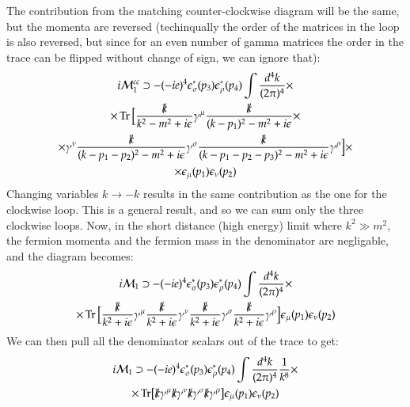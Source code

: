 \documentclass{article}
\begin{document}
The contribution from the matching counter-clockwise diagram will be the same, but the momenta are reversed (techinqually the order of the matrices in the loop is also reversed, but since for an even number of gamma matrices the order in the trace can be flipped without change of sign, we can ignore that):
\begin{equation}
\begin{gathered}
    i \mathcal{M}_1^{cc} \supset
    -(-ie)^4\epsilon^*_\sigma(p_3)\epsilon^*_\rho(p_4)
    \int \frac{d^4k}{(2\pi)^4}
    \times \\ \times
    \Tr\Big[\frac{\slashed{k}}{k^2 - m^2 + i\epsilon}\gamma^\mu \frac{\slashed{k}}{(k - p_1)^2 - m^2 + i\epsilon}
    \times \\ \times
    \gamma^\nu\frac{\slashed{k}}{(k - p_1 - p_2)^2 - m^2 + i\epsilon}\gamma^\sigma \frac{\slashed{k}}{(k - p_1 - p_2 - p_3)^2 - m^2 + i\epsilon}\gamma^\rho \Big]
    \times \\ \times
    \epsilon_\mu(p_1)\epsilon_\nu(p_2)
\end{gathered}
\end{equation}
Changing variables $k \rightarrow -k$ results in the same contribution as the one for the clockwise loop. This is a general result, and so we can sum only the three clockwise loops. Now, in the short distance (high energy) limit where $k^2 \gg m^2$, the fermion momenta and the fermion mass in the denominator are negligable, and the diagram becomes:
\begin{equation}
\begin{gathered}
    i \mathcal{M}_1 \supset
    -(-ie)^4\epsilon^*_\sigma(p_3)\epsilon^*_\rho(p_4)
    \int \frac{d^4k}{(2\pi)^4}
    \times \\ \times
    \Tr\Big[\frac{\slashed{k}}{k^2 + i\epsilon}\gamma^\mu \frac{\slashed{k}}{k^2 + i\epsilon}
    \gamma^\nu\frac{\slashed{k}}{k^2 + i\epsilon}\gamma^\sigma \frac{\slashed{k}}{k^2 + i\epsilon}\gamma^\rho \Big]
    \epsilon_\mu(p_1)\epsilon_\nu(p_2)
\end{gathered}
\end{equation}
We can then pull all the denominator scalars out of the trace to get:
\begin{equation}
\begin{gathered}
    i \mathcal{M}_1 \supset
    -(-ie)^4\epsilon^*_\sigma(p_3)\epsilon^*_\rho(p_4)
    \int \frac{d^4k}{(2\pi)^4} \frac{1}{k^8}
    \times \\ \times
    \Tr[\slashed{k}\gamma^\mu \slashed{k}
    \gamma^\nu\slashed{k} \gamma^\sigma \slashed{k} \gamma^\rho]
    \epsilon_\mu(p_1)\epsilon_\nu(p_2)
\end{gathered}
\end{equation}
\end{document}

